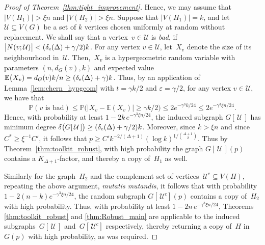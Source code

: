 \documentclass[final]{article}
\theoremstyle{definition}
\newcommand{\eps}{\varepsilon}
\newcommand{\exth}{\delta_{\rm e}(\Delta)}
\begin{document}
\begin{proof}[Proof of Theorem~\ref{thm:tight_improvement}]
    Hence, we may assume that $|V(H_1)| > \xi n$ and $|V(H_2)| > \xi n$. Suppose that $|V(H_1)| = k$, and let $\mathcal{U} \subseteq V(G)$ be a set of $k$ vertices chosen uniformly at random without replacement. We shall say that a vertex~$v \in \mathcal{U}$ is \emph{bad}, if $\bigl|N(v; \mathcal{U})\bigr| < (\exth + \gamma/2)k$. For any vertex $v \in \mathcal{U}$, let~$X_v$ denote the size of its neighbourhood in~$\mathcal{U}$. Then,~$X_v$ is a hypergeometric random variable with parameters $(n, d_G(v), k)$ and expected value $\mathbb{E}\bigl(X_v) = d_G(v)k/n \geq (\exth + \gamma)k$. Thus, by an application of Lemma~\ref{lem:chern_hypgeom} with $t = \gamma k/2$ and $\eps = \gamma/2$, for any vertex $v \in \mathcal{U}$, we have that 
    $$\mathbb{P}(\text{$v$ is bad}) \leq \mathbb{P}\bigl(|X_v - \mathbb{E}(X_v)| \geq \gamma k/2 \bigr) \leq 2e^{-\gamma^3 k/24} \leq 2e^{-\gamma^3 \xi n/24}.$$
    Hence, with probability at least $1 - 2k\,e^{-\gamma^3 \xi n/24}$, the induced subgraph $G[\,\mathcal{U}\,]$ has minimum degree $\delta\bigl(G[\,\mathcal{U}\,]\bigr) \geq (\exth + \gamma/2)k$. Moreover, since $k > \xi n$ and since $C^* \geq \xi^{-1}C'$, it follows that $p  \geq C'k^{-2/(\Delta+1)}(\log k)^{1/\binom{\Delta+1}{2}}.$
    Thus by Theorem~\ref{thm:toolkit_robust}, with high probability the graph $G[\,\mathcal{U}\,](p)$ contains a $K_{\Delta+1}$-factor, and thereby a copy of~$H_1$ as well. 
    
    Similarly for the graph~$H_2$ and the complement set of vertices~$\mathcal{U}^c \subseteq V(H)$, repeating the above argument, \emph{mutatis mutandis}, it follows that with probability $1 - 2(n-k)e^{-\gamma^3 \xi n/24}$, the random subgraph $G[\,\mathcal{U}^c](p)$ contains a copy of~$H_2$ with high probability. Thus, with probability at least $1 - 2n\,e^{-\gamma^3 \xi n/24}$, Theorems \ref{thm:toolkit_robust} and \ref{thm:Robust_main} are applicable to the induced subgraphs~$G[\,\mathcal{U}\,]$ and~$G[\,\mathcal{U}^c]$ respectively, thereby returning a copy of~$H$ in~$G(p)$ with high probability, as was required.  
\end{proof}



%
\end{document}
